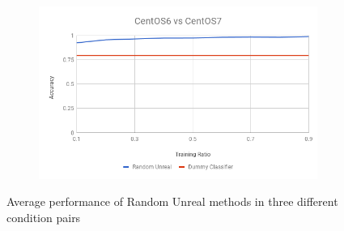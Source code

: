 \documentclass[10pt, conference, compsocconf]{IEEEtran}
\begin{document}
\begin{figure}[h!]
\begin{subfigure}[b]{0.8\linewidth}
                \includegraphics[width=\columnwidth]{figures/ALS/unreal-ALS-6vs7-PFS}
        \end{subfigure}
        \caption{Average performance of Random Unreal methods in three different condition pairs}
        \label{fig:unreal method}
\end{figure}
\end{document}
